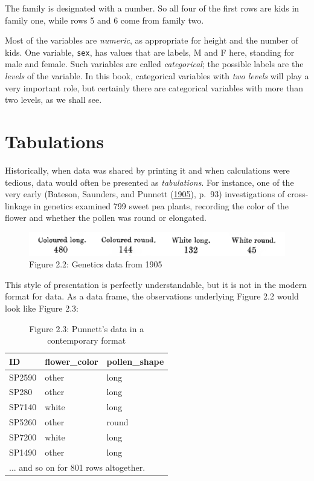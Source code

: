\documentclass[]{tufte-book}
\begin{document}
The family is designated with a number. So all four of the first rows are kids in family one, while rows 5 and 6 come from family two.

Most of the variables are \emph{numeric}, as appropriate for height and the number of kids. One variable, \texttt{sex}, has values that are labels, M and F here, standing for male and female. Such variables are called \emph{categorical}; the possible labels are the \emph{levels} of the variable. In this book, categorical variables with \emph{two levels} will play a very important role, but certainly there are categorical variables with more than two levels, as we shall see.

\hypertarget{tabulations}{%
\section{Tabulations}\label{tabulations}}

Historically, when data was shared by printing it and when calculations were tedious, data would often be presented as \emph{tabulations}. For instance, one of the very early (Bateson, Saunders, and Punnett (\protect\hyperlink{ref-punnett-1905}{1905}), p.~93) investigations of cross-linkage in genetics examined 799 sweet pea plants, recording the color of the flower and whether the pollen was round or elongated.

\begin{figure}\includegraphics[width=0.8\linewidth]{images/Punnet-page-93} \caption[Figure 2.2]{Figure 2.2: Genetics data from 1905}\label{fig:punnett-93}
\end{figure}

This style of presentation is perfectly understandable, but it is not in the modern format for data. As a data frame, the observations underlying Figure 2.2 would look like Figure 2.3:

\begin{table}

\caption{\label{tab:punnet-raw}Figure 2.3: Punnett's data in a contemporary format}
\centering
\begin{tabular}[t]{l|l|l}
\hline
ID & flower\_color & pollen\_shape\\
\hline
SP2590 & other & long\\
\hline
SP280 & other & long\\
\hline
SP7140 & white & long\\
\hline
SP5260 & other & round\\
\hline
SP7200 & white & long\\
\hline
SP1490 & other & long\\
\hline
\multicolumn{3}{l}{... and so on for 801 rows altogether.}\\
\end{tabular}
\end{table}
\end{document}
